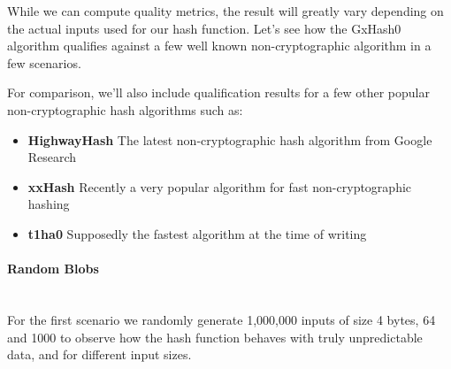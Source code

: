 \documentclass[10pt]{article}
\begin{document}
While we can compute quality metrics, the result will greatly vary depending on the actual inputs used for our hash function. Let's see how the GxHash0 algorithm qualifies against a few well known non-cryptographic algorithm in a few scenarios.

For comparison, we'll also include qualification results for a few other popular non-cryptographic hash algorithms such as:

\begin{itemize}
\item \textbf{HighwayHash}\cite{highwayhash} The latest non-cryptographic hash algorithm from Google Research
\item \textbf{xxHash}\cite{twox-hash} Recently a very popular algorithm for fast non-cryptographic hashing
\item \textbf{t1ha0}\cite{rust-t1ha} Supposedly the fastest algorithm at the time of writing
\end{itemize}

\clearpage
\paragraph{Random Blobs}\leavevmode\\
For the first scenario we randomly generate 1,000,000 inputs of size 4 bytes, 64 and 1000 to observe how the hash function behaves with truly unpredictable data, and for different input sizes.
\end{document}
